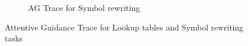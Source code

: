 \begin{figure}[ht]
\begin{subfigure}[b]{0.5\linewidth}
		\fi 
		\caption{AG Trace for Symbol rewriting} 
		\label{ag_sr} 
		\vspace{2ex}
	\end{subfigure}
	\caption{Attentive Guidance Trace for Lookup tables and Symbol rewriting tasks}
	\label{lt_sr_trace}
\end{figure}